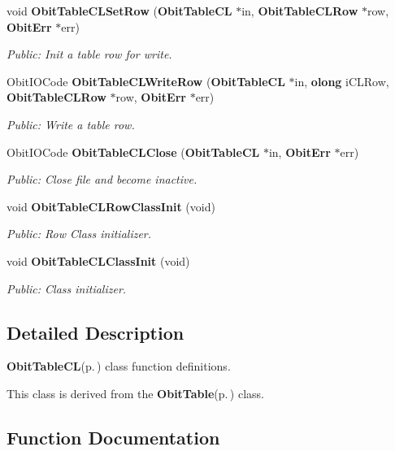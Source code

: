 \begin{CompactItemize}
void {\bf Obit\-Table\-CLSet\-Row} ({\bf Obit\-Table\-CL} $\ast$in, {\bf Obit\-Table\-CLRow} $\ast$row, {\bf Obit\-Err} $\ast$err)
\begin{CompactList}\small\item\em Public: Init a table row for write. \item\end{CompactList}\item 
Obit\-IOCode {\bf Obit\-Table\-CLWrite\-Row} ({\bf Obit\-Table\-CL} $\ast$in, {\bf olong} i\-CLRow, {\bf Obit\-Table\-CLRow} $\ast$row, {\bf Obit\-Err} $\ast$err)
\begin{CompactList}\small\item\em Public: Write a table row. \item\end{CompactList}\item 
Obit\-IOCode {\bf Obit\-Table\-CLClose} ({\bf Obit\-Table\-CL} $\ast$in, {\bf Obit\-Err} $\ast$err)
\begin{CompactList}\small\item\em Public: Close file and become inactive. \item\end{CompactList}\item 
void {\bf Obit\-Table\-CLRow\-Class\-Init} (void)
\begin{CompactList}\small\item\em Public: Row Class initializer. \item\end{CompactList}\item 
void {\bf Obit\-Table\-CLClass\-Init} (void)
\begin{CompactList}\small\item\em Public: Class initializer. \item\end{CompactList}\end{CompactItemize}


\subsection{Detailed Description}
{\bf Obit\-Table\-CL}{\rm (p.\,\pageref{structObitTableCL})} class function definitions. 

This class is derived from the {\bf Obit\-Table}{\rm (p.\,\pageref{structObitTable})} class.

\subsection{Function Documentation}

